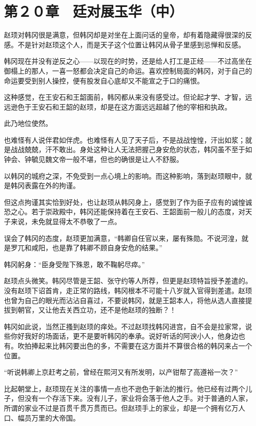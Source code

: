 \section{第２０章　廷对展玉华（中）}

赵顼对韩冈很是满意，但韩冈却是对坐在上面问话的皇帝，却有着隐藏得很深的反感。不是针对赵顼这个人，而是天子这个位置让韩冈从骨子里感到忌惮和反感。

韩冈现在并没有逆反之心——以现在的时势，还是给人打工是正经——不过高坐在御榻上的那人，一喜一怒都会决定自己的命运。喜欢控制局面的韩冈，对于自己的命运要受到别人操控，便有股发自心底却又不能宣之于口的痛恨。

这种感觉，在王安石和王韶面前，韩冈都从来没有感受过。但论起才学、才智，远远逊色于王安石和王韶的赵顼，却是在这方面远远超越了他的宰相和执政。

此乃地位使然。

也难怪有人说伴君如伴虎。也难怪有人见了天子后，不是战战惶惶，汗出如浆；就是战战兢兢，汗不敢出。身处这种让人无法把握己身安危的状态，韩冈虽不至于如钟会、钟毓见魏文帝一般不堪，但也的确很是让人不舒服。

以韩冈的城府之深，不免受到一点心境上的影响。而这种影响，落到赵顼眼中，就是韩冈表露在外的拘谨。

但这点拘谨其实恰到好处，也让赵顼从韩冈身上，感觉到了作为臣子应有的诚惶诚恐之心。若于崇政殿中，韩冈还能保持着在王安石、王韶面前一般儿的态度，对天子来说，未免就显得太不恭敬了一点。

误会了韩冈的态度，赵顼更加满意，“韩卿自任官以来，屡有殊勋。不说河湟，就是罗兀和咸阳，也是靠了韩卿不顾自身安危的结果。”

韩冈躬身：“臣身受陛下殊恩，敢不鞠躬尽瘁。”

赵顼点头微笑。韩冈尽管是王韶、张守约等人所荐，但更是赵顼特旨授予差遣的。没有赵顼下诏首肯，走正常的路线，韩冈根本不可能十八岁就入官得到差遣。赵顼也曾为自己的眼光而沾沾自喜过，不要说韩冈，就是王韶本人，将他从选人直接提拔到朝官，又让他去关西立功，还不是他赵顼的独断？！

韩冈如此说，当然正搔到赵顼的痒处。不过赵顼找韩冈进宫，自不会是拉家常，说些你好我好的场面话，更不是要听韩冈的奉承。说好听话的阿谀小人，他身边也有。吹拍捧起来比韩冈要出色的多，不需要在这方面并不算很合格的韩冈来占一个位置。

“听说韩卿上京赶考之前，曾经在熙河又有所发明，以产钳帮了高遵裕一次？”

比起朝堂上，赵顼现在关注的事情一点也不逊色于新法的推行。他已经有过两个儿子，但没有一个存活下来。没有儿子，家业将会落于他人之手。对于普通的人家，所谓的家业不过是百贯千贯万贯而已。但赵顼手上的家业，却是一个拥有亿万人口、幅员万里的大帝国。

